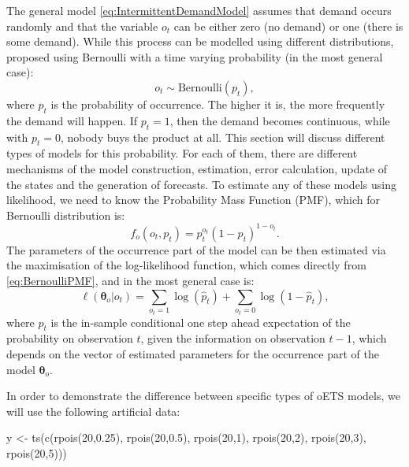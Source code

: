 \documentclass[
]{book}
\newenvironment{Shaded}{\begin{snugshade}}{\end{snugshade}}
\newcommand{\DecValTok}[1]{\textcolor[rgb]{0.00,0.00,0.81}{#1}}
\newcommand{\FloatTok}[1]{\textcolor[rgb]{0.00,0.00,0.81}{#1}}
\newcommand{\FunctionTok}[1]{\textcolor[rgb]{0.00,0.00,0.00}{#1}}
\newcommand{\NormalTok}[1]{#1}
\newcommand{\OtherTok}[1]{\textcolor[rgb]{0.56,0.35,0.01}{#1}}
\theoremstyle{definition}
\theoremstyle{definition}
\theoremstyle{definition}
\theoremstyle{definition}
\theoremstyle{remark}
\begin{document}
The general model \eqref{eq:IntermittentDemandModel} assumes that demand occurs randomly and that the variable \(o_t\) can be either zero (no demand) or one (there is some demand). While this process can be modelled using different distributions, \citet{Svetunkov2019a} proposed using Bernoulli with a time varying probability (in the most general case):
\begin{equation}
o_t \sim \text{Bernoulli} \left(p_t \right) ,
\label{eq:OccurrenceModelBernoulli}
\end{equation}
where \(p_t\) is the probability of occurrence. The higher it is, the more frequently the demand will happen. If \(p_t=1\), then the demand becomes continuous, while with \(p_t=0\), nobody buys the product at all. This section will discuss different types of models for this probability. For each of them, there are different mechanisms of the model construction, estimation, error calculation, update of the states and the generation of forecasts. To estimate any of these models using likelihood, we need to know the Probability Mass Function (PMF), which for Bernoulli distribution is:
\begin{equation}
f_o(o_t, p_t) = p_t^{o_t}(1-p_t)^{1-o_t}.
\label{eq:BernoulliPMF}
\end{equation}
The parameters of the occurrence part of the model can be then estimated via the maximisation of the log-likelihood function, which comes directly from \eqref{eq:BernoulliPMF}, and in the most general case is:
\begin{equation}
\ell \left(\boldsymbol{\theta}_o | o_t \right) = \sum_{o_t=1} \log(\hat{p}_t) + \sum_{o_t=0} \log(1-\hat{p}_t) ,
\label{eq:oETSLikelihood}
\end{equation}
where \(\hat{p}_t\) is the in-sample conditional one step ahead expectation of the probability on observation \(t\), given the information on observation \(t-1\), which depends on the vector of estimated parameters for the occurrence part of the model \(\boldsymbol{\theta}_o\).

In order to demonstrate the difference between specific types of oETS models, we will use the following artificial data:

\begin{Shaded}
\begin{Highlighting}[]
\NormalTok{y }\OtherTok{\textless{}{-}} \FunctionTok{ts}\NormalTok{(}\FunctionTok{c}\NormalTok{(}\FunctionTok{rpois}\NormalTok{(}\DecValTok{20}\NormalTok{,}\FloatTok{0.25}\NormalTok{), }\FunctionTok{rpois}\NormalTok{(}\DecValTok{20}\NormalTok{,}\FloatTok{0.5}\NormalTok{), }\FunctionTok{rpois}\NormalTok{(}\DecValTok{20}\NormalTok{,}\DecValTok{1}\NormalTok{),}
          \FunctionTok{rpois}\NormalTok{(}\DecValTok{20}\NormalTok{,}\DecValTok{2}\NormalTok{), }\FunctionTok{rpois}\NormalTok{(}\DecValTok{20}\NormalTok{,}\DecValTok{3}\NormalTok{), }\FunctionTok{rpois}\NormalTok{(}\DecValTok{20}\NormalTok{,}\DecValTok{5}\NormalTok{)))}
\end{Highlighting}
\end{Shaded}
\end{document}
